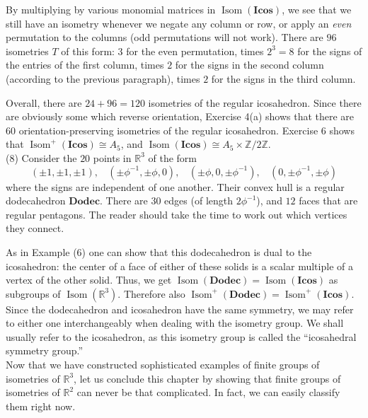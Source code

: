 \documentclass[leqno]{book}
\begin{document}
By multiplying by various monomial matrices in $\operatorname{Isom}(\mathbf{Icos})$, we see that we still have an isometry whenever we negate any column or row, or apply an \emph{even} permutation to the columns (odd permutations will not work).  There are $96$ isometries $T$ of this form: $3$ for the even permutation, times $2^3=8$ for the signs of the entries of the first column, times $2$ for the signs in the second column (according to the previous paragraph), times $2$ for the signs in the third column.

Overall, there are $24+96=120$ isometries of the regular icosahedron.  Since there are obviously some which reverse orientation, Exercise 4(a) shows that there are $60$ orientation-preserving isometries of the regular icosahedron.  Exercise 6 shows that $\operatorname{Isom}^+(\mathbf{Icos})\cong A_5$, and $\operatorname{Isom}(\mathbf{Icos})\cong A_5\times\mathbb Z/2\mathbb Z$.\\

(8) Consider the $20$ points in $\mathbb R^3$ of the form
$$(\pm 1,\pm 1,\pm 1),~~~~(\pm\phi^{-1},\pm\phi,0),~~~~(\pm\phi,0,\pm\phi^{-1}),~~~~(0,\pm\phi^{-1},\pm\phi)$$
where the signs are independent of one another.  Their convex hull is a regular dodecahedron $\mathbf{Dodec}$.  There are $30$ edges (of length $2\phi^{-1}$), and $12$ faces that are regular pentagons.  The reader should take the time to work out which vertices they connect.

As in Example (6) one can show that this dodecahedron is dual to the icosahedron: the center of a face of either of these solids is a scalar multiple of a vertex of the other solid.  Thus, we get $\operatorname{Isom}(\mathbf{Dodec})=\operatorname{Isom}(\mathbf{Icos})$ as subgroups of $\operatorname{Isom}(\mathbb R^3)$.  Therefore also $\operatorname{Isom}^+(\mathbf{Dodec})=\operatorname{Isom}^+(\mathbf{Icos})$.  Since the dodecahedron and icosahedron have the same symmetry, we may refer to either one interchangeably when dealing with the isometry group.  We shall usually refer to the icosahedron, as this isometry group is called the ``icosahedral symmetry group.''\\ %

\noindent Now that we have constructed sophisticated examples of finite groups of isometries of $\mathbb R^3$, let us conclude this chapter by showing that finite groups of isometries of $\mathbb R^2$ can never be that complicated.  In fact, we can easily classify them right now.
\end{document}
